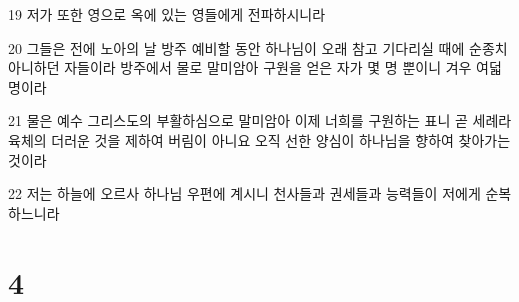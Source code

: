 \par 19 저가 또한 영으로 옥에 있는 영들에게 전파하시니라
\par 20 그들은 전에 노아의 날 방주 예비할 동안 하나님이 오래 참고 기다리실 때에 순종치 아니하던 자들이라 방주에서 물로 말미암아 구원을 얻은 자가 몇 명 뿐이니 겨우 여덟명이라
\par 21 물은 예수 그리스도의 부활하심으로 말미암아 이제 너희를 구원하는 표니 곧 세례라 육체의 더러운 것을 제하여 버림이 아니요 오직 선한 양심이 하나님을 향하여 찾아가는 것이라
\par 22 저는 하늘에 오르사 하나님 우편에 계시니 천사들과 권세들과 능력들이 저에게 순복하느니라

\chapter{4}

